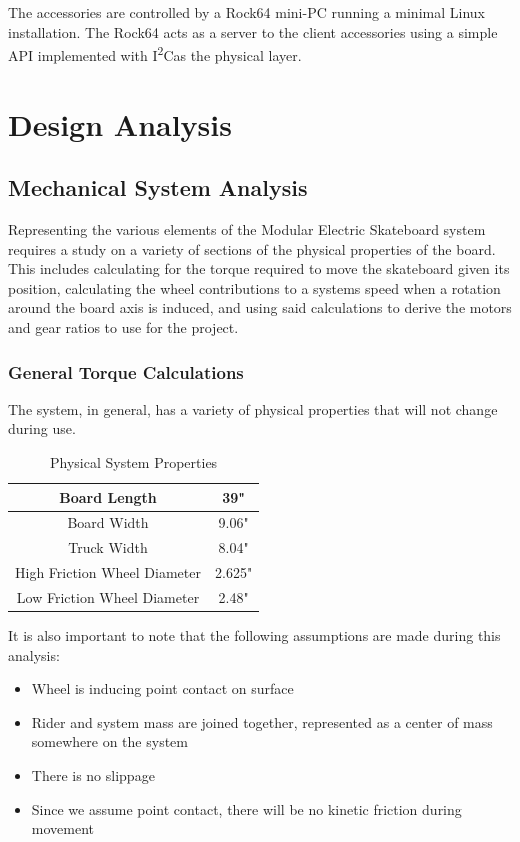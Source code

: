 \documentclass[titlepage, letterpaper,12pt]{article}
\newcommand{\itwoc}{I\textsuperscript{2}C}
\begin{document}
The accessories are controlled by a Rock64 mini-PC running a minimal Linux installation. The Rock64 acts as a server to the client accessories using a simple API implemented with \itwoc as the physical layer.

\section{Design Analysis}

\subsection{Mechanical System Analysis}
Representing the various elements of the Modular Electric Skateboard system requires a study on a variety of sections of the physical properties of the board. This includes calculating for the torque required to move the skateboard given its position, calculating the wheel contributions to a systems speed when a rotation around the board axis is induced, and using said calculations to derive the motors and gear ratios to use for the project.
\subsubsection{General Torque Calculations}
The system, in general, has a variety of physical properties that will not change during use.

\begin{table}[h]
\caption{Physical System Properties}
\begin{center}
 \begin{tabular}{||c c||}
 \hline
 Board Length & 39" \\
 \hline
 Board Width & 9.06" \\
 \hline
 Truck Width & 8.04" \\
 \hline
 High Friction Wheel Diameter & 2.625" \\
 \hline
 Low Friction Wheel Diameter & 2.48" \\
 \hline
\end{tabular}
\end{center}
\label{table:phys}
\end{table}

It is also important to note that the following assumptions are made during this analysis:
\begin{itemize}
    \item Wheel is inducing point contact on surface
    \item Rider and system mass are joined together, represented as a center of mass somewhere on the system
    \item There is no slippage
    \item Since we assume point contact, there will be no kinetic friction during movement
\end{itemize}
\end{document}
